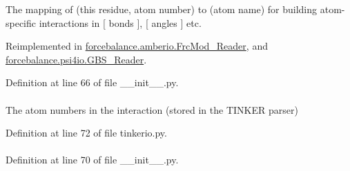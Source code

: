 \-The mapping of (this residue, atom number) to (atom name) for building atom-\/specific interactions in \mbox{[} bonds \mbox{]}, \mbox{[} angles \mbox{]} etc. 



\-Reimplemented in \hyperlink{classforcebalance_1_1amberio_1_1FrcMod__Reader_ae3b36131778cad32336f88fdb6d724ee}{forcebalance.\-amberio.\-Frc\-Mod\-\_\-\-Reader}, and \hyperlink{classforcebalance_1_1psi4io_1_1GBS__Reader_aa7cbae977f7e9a4e14ba1d45f62bb5fa}{forcebalance.\-psi4io.\-G\-B\-S\-\_\-\-Reader}.



\-Definition at line 66 of file \-\_\-\-\_\-init\-\_\-\-\_\-.\-py.

\hypertarget{classforcebalance_1_1tinkerio_1_1Tinker__Reader_acac78bb7c4f39ed7525d3d6c49ee643b}{
\paragraph[{atom}]{}}\label{classforcebalance_1_1tinkerio_1_1Tinker__Reader_acac78bb7c4f39ed7525d3d6c49ee643b}


\-The atom numbers in the interaction (stored in the \-T\-I\-N\-K\-E\-R parser) 



\-Definition at line 72 of file tinkerio.\-py.

\hypertarget{classforcebalance_1_1BaseReader_a69ca7d949a4a3df4d9f61e617fe0e270}{
\paragraph[{\-Atom\-Types}]{}}\label{classforcebalance_1_1BaseReader_a69ca7d949a4a3df4d9f61e617fe0e270}


\-Definition at line 70 of file \-\_\-\-\_\-init\-\_\-\-\_\-.\-py.


